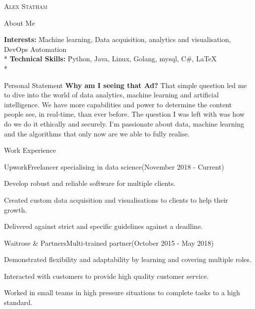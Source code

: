 \documentclass[]{article}
\newlength{\tabin}
\newlength{\secsep}
\newcommand{\lineunder}{\vspace*{-8pt} \\ \hspace*{-6pt} \hrulefill \\ \vspace*{-15pt}}
\newcommand{\name}[1]{\begin{center}\textsc{\Huge#1}\\\end{center}}
\newcommand{\contact}[1]{\begin{center}\color{contactgray}{\small#1}\end{center}}
\newenvironment{tabbedsection}[1]{
  \begin{list}{}{
      \setlength{\itemsep}{0pt}
      \setlength{\labelsep}{0pt}
      \setlength{\labelwidth}{0pt}
      \setlength{\leftmargin}{\tabin}
      \setlength{\rightmargin}{\tabin}
      \setlength{\listparindent}{0pt}
      \setlength{\parsep}{0pt}
      \setlength{\parskip}{0pt}
      \setlength{\partopsep}{0pt}
      \setlength{\topsep}{#1}
    }
  \item[]
}{\end{list}}
\newenvironment{nospacetabbing}{
    \begin{tabbing}
}{\end{tabbing}\vspace{-1.2em}}
\newenvironment{resume_header}{}{\vspace{0pt}}
\newenvironment{resume_section}[1]{
  \filbreak
  \vspace{2\secsep}
  \textsc{\large#1}
  \lineunder
  \begin{tabbedsection}{\secsep}
}{\end{tabbedsection}}
\newenvironment{subitems}{
  \renewcommand{\labelitemi}{-}
  \begin{itemize}
      \setlength{\labelsep}{1em}
}{\end{itemize}}
\newenvironment{resume_employer}[4]{
  \vspace{\secsep}
  \textbf{#1} \\ 
  \indent {\small #2} \hfill {\footnotesize#3 (#4)}
  \begin{tabbedsection}{0pt}
  \begin{subitems}
}{\end{subitems}\end{tabbedsection}}
\begin{document}
\begin{resume_header}
\name{Alex Statham}
\contact{alex.staham1998@gmail.com  $\bullet$ +447490973388 }
\end{resume_header}

\begin{resume_section}{About Me}
  \begin{nospacetabbing}
  \textbf{Interests:}  \= Machine learning,  Data acquisition, analytics and visualisation, DevOps Automation \\*
  \textbf{Technical Skills:}  \= Python, Java, Linux, Golang, mysql, C\#,  \LaTeX\\*
  \end{nospacetabbing}
\end{resume_section}

\begin{resume_section}{Personal Statement}
  \textbf{Why am I seeing that Ad?} That simple question led  me to dive into the world of data analytics, machine learning and  artificial intelligence. We have more capabilities and power to determine the content people see, in real-time, than ever before. The question I was left with was how do we do it ethically and securely. I'm passionate about data, machine learning and the algorithms that only now are we able to fully realise.
\end{resume_section}

\begin{resume_section}{Work Experience}
  \begin{resume_employer}{Upwork}{Freelancer specialising in data science}{(November 2018 - Current)}{}
    \item Develop robust and reliable software for multiple clients.
    \item Created custom data acquisition and  visualisations to clients to help their growth.
    \item Delivered against strict and specific guidelines against a deadline.
  \end{resume_employer}
  
  \begin{resume_employer}{Waitrose \& Partners}{Multi-trained partner}{(October 2015 - May 2018)}{}
    \item Demonstrated flexibility and adaptability by learning and covering multiple roles.
    \item Interacted with customers to provide high quality customer service.
    \item Worked in small teams in high pressure situations to complete tasks to a high standard.
  \end{resume_employer}
\end{resume_section}
\end{document}

